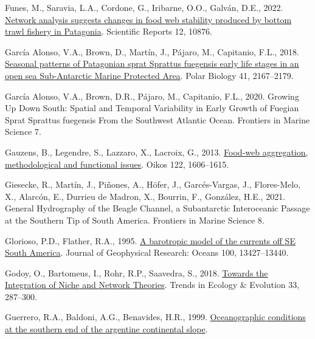 \documentclass[preprint, 3p,
authoryear]{elsarticle} %
\newlength{\cslhangindent}
\newlength{\cslentryspacingunit} %
\newenvironment{CSLReferences}[2] %
 {%
  \setlength{\parindent}{0pt}
  \ifodd #1
  \let\oldpar\par
  \def\par{\hangindent=\cslhangindent\oldpar}
  \fi
  \setlength{\parskip}{#2\cslentryspacingunit}
 }%
 {}
\begin{document}
\begin{CSLReferences}{1}{0}
\leavevmode{}%
Funes, M., Saravia, L.A., Cordone, G., Iribarne, O.O., Galván, D.E.,
2022. \href{https://doi.org/10.1038/s41598-022-14363-y}{Network analysis
suggests changes in food web stability produced by bottom trawl fishery
in {Patagonia}}. Scientific Reports 12, 10876.

\leavevmode{}%
García Alonso, V.A., Brown, D., Martín, J., Pájaro, M., Capitanio, F.L.,
2018. \href{https://doi.org/10.1007/s00300-018-2352-z}{Seasonal patterns
of {Patagonian} sprat {Sprattus} fuegensis early life stages in an open
sea {Sub-Antarctic Marine Protected Area}}. Polar Biology 41,
2167--2179.

\leavevmode{}%
García Alonso, V.A., Brown, D.R., Pájaro, M., Capitanio, F.L., 2020.
Growing {Up Down South}: {Spatial} and {Temporal Variability} in {Early
Growth} of {Fuegian Sprat Sprattus} fuegensis {From} the {Southwest
Atlantic Ocean}. Frontiers in Marine Science 7.

\leavevmode{}%
Gauzens, B., Legendre, S., Lazzaro, X., Lacroix, G., 2013.
\href{https://doi.org/10.1111/j.1600-0706.2013.00266.x}{Food-web
aggregation, methodological and functional issues}. Oikos 122,
1606--1615.

\leavevmode{}%
Giesecke, R., Martín, J., Piñones, A., Höfer, J., Garcés-Vargas, J.,
Flores-Melo, X., Alarcón, E., Durrieu de Madron, X., Bourrin, F.,
González, H.E., 2021. General {Hydrography} of the {Beagle Channel}, a
{Subantarctic Interoceanic Passage} at the {Southern Tip} of {South
America}. Frontiers in Marine Science 8.

\leavevmode{}%
Glorioso, P.D., Flather, R.A., 1995.
\href{https://doi.org/10.1029/95JC00942}{A barotropic model of the
currents off {SE South America}}. Journal of Geophysical Research:
Oceans 100, 13427--13440.

\leavevmode{}%
Godoy, O., Bartomeus, I., Rohr, R.P., Saavedra, S., 2018.
\href{https://doi.org/10.1016/j.tree.2018.01.007}{Towards the
{Integration} of {Niche} and {Network Theories}}. Trends in Ecology \&
Evolution 33, 287--300.

\leavevmode{}%
Guerrero, R.A., Baldoni, A.G., Benavides, H.R., 1999.
\href{http://10.0.64.26/handle/inidep/247}{Oceanographic conditions at
the southern end of the argentine continental slope}.


\end{CSLReferences}
\end{document}
